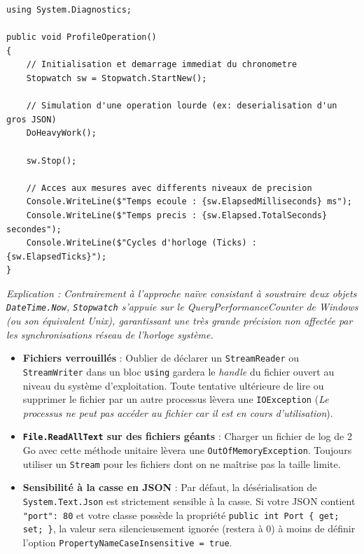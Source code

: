 \begin{lstlisting}[language={[Sharp]C}]
using System.Diagnostics;

public void ProfileOperation()
{
    // Initialisation et demarrage immediat du chronometre
    Stopwatch sw = Stopwatch.StartNew();

    // Simulation d'une operation lourde (ex: deserialisation d'un gros JSON)
    DoHeavyWork(); 

    sw.Stop();

    // Acces aux mesures avec differents niveaux de precision
    Console.WriteLine($"Temps ecoule : {sw.ElapsedMilliseconds} ms");
    Console.WriteLine($"Temps precis : {sw.Elapsed.TotalSeconds} secondes");
    Console.WriteLine($"Cycles d'horloge (Ticks) : {sw.ElapsedTicks}");
}
\end{lstlisting}
\textit{Explication : Contrairement à l'approche naïve consistant à soustraire deux objets \texttt{DateTime.Now}, \texttt{Stopwatch} s'appuie sur le \textit{QueryPerformanceCounter} de Windows (ou son équivalent Unix), garantissant une très grande précision non affectée par les synchronisations réseau de l'horloge système.}

\begin{tcolorbox}[colback=red!5!white,colframe=red!75!black,title=Pièges courants \& Erreurs d'exécution]
\begin{itemize}
    \item \textbf{Fichiers verrouillés} : Oublier de déclarer un \texttt{StreamReader} ou \texttt{StreamWriter} dans un bloc \texttt{using} gardera le \textit{handle} du fichier ouvert au niveau du système d'exploitation. Toute tentative ultérieure de lire ou supprimer le fichier par un autre processus lèvera une \texttt{IOException} (\textit{Le processus ne peut pas accéder au fichier car il est en cours d'utilisation}).
    \item \textbf{\texttt{File.ReadAllText} sur des fichiers géants} : Charger un fichier de log de 2 Go avec cette méthode unitaire lèvera une \texttt{OutOfMemoryException}. Toujours utiliser un \texttt{Stream} pour les fichiers dont on ne maîtrise pas la taille limite.
    \item \textbf{Sensibilité à la casse en JSON} : Par défaut, la désérialisation de \texttt{System.Text.Json} est strictement sensible à la casse. Si votre JSON contient \texttt{"port": 80} et votre classe possède la propriété \texttt{public int Port \{ get; set; \}}, la valeur sera silencieusement ignorée (restera à 0) à moins de définir l'option \texttt{PropertyNameCaseInsensitive = true}.
\end{itemize}
\end{tcolorbox}

